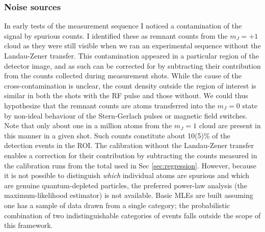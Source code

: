\subsubsection{Noise sources}
\label{sec:spinpop}

	In early tests of the measurement sequence I noticed a contamination of the signal by spurious counts. 
	I identified these as remnant counts from the $m_J=+1$ cloud as they were still visible when we ran an experimental sequence without the Landau-Zener transfer. 
	This contamination appeared in a particular region of the detector image, and as such can be corrected for by subtracting their contribution from the counts collected during measurement shots. 
	While the cause of the cross-contamination is unclear, the count density outside the region of interest is similar in both the shots with the RF pulse and those without. 
	We could thus hypothesize that the remnant counts are atoms transferred into the $m_J=0$ state by non-ideal behaviour of the Stern-Gerlach pulses or magnetic field switches. 
	Note that only about one in a million atoms from the $m_J=1$ cloud are present in this manner in a given shot.
	{Such counts constitute about 10(5)\% of the detection events in the ROI. 
	The calibration without the Landau-Zener transfer enables a correction for their contribution by subtracting the counts measured in the calibration runs from the total used in Sec \ref{sec:regression}.
	However, because it is not possible to distinguish \emph{which} individual atoms are spurious and which are genuine quantum-depleted particles, the preferred power-law analysis (the maximum-likelihood estimator) is not available. 
	Basic MLEs are built assuming one has a sample of data drawn from a single category; the probabilistic combination of two indistinguishable categories of events falls outside the scope of this framework.}


